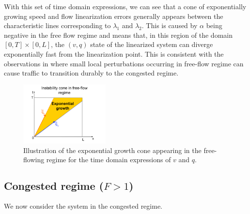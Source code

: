 \documentclass[5p,twocolumn]{elsarticle}
\begin{document}
With this set of time domain expressions, we can see that a cone of exponentially growing speed and flow linearization errors generally appears between the characteristic lines corresponding to $\lambda_{1}$ and $\lambda_{2}$. This is caused by $\alpha$ being negative in the free flow regime and means that, in this region of the domain $\left[0,T\right] \times \left[0,L\right]$, the $\left(v,q\right)$ state of the linearized system can diverge exponentially fast from the linearization point. This is consistent with the observations in \cite{PhysRevLett.79.4030} where small local perturbations occurring in free-flow regime can cause traffic to transition durably to the congested regime.

\begin{figure}
\begin{centering}
\includegraphics[width=4.5cm]{Exp-growth}
\par\end{centering}
\protect\caption{Illustration of the exponential growth cone appearing in the free-flowing regime for the time domain expressions of $v$ and $q$.\label{Exp-growth}}
\end{figure}

\subsection{Congested regime ($F>1$)}
We now consider the system in the congested regime.
\end{document}
